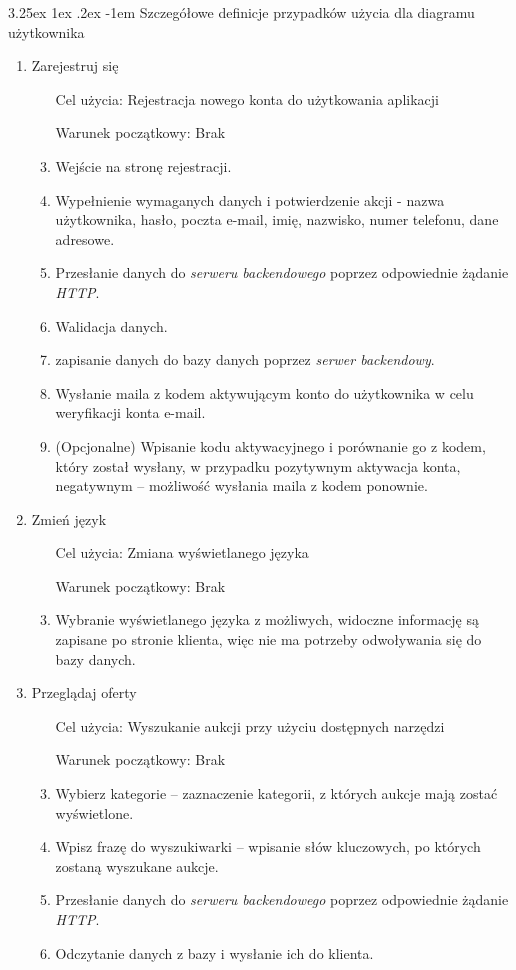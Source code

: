 \documentclass[10pt,titlepage]{article} %
\makeatletter
\renewcommand{\normalsize}{\fontsize{8pt}{10pt}\selectfont} %
\renewcommand\paragraph{\@startsection{paragraph}{5}{\z@}%
  {3.25ex \@plus1ex \@minus.2ex}%
  {-1em}%
  {\normalfont\normalsize\bfseries}}
\makeatother
\begin{document}
\paragraph{Szczegółowe definicje przypadków użycia dla diagramu użytkownika}\mbox{}\\
\begin{enumerate}[1.]
\item Zarejestruj się
\begin{enumerate}
\item[Cel użycia:] Rejestracja nowego konta do użytkowania aplikacji
\item[Warunek początkowy:] Brak
\item Wejście na stronę rejestracji.
\item Wypełnienie wymaganych danych i potwierdzenie akcji - nazwa użytkownika, hasło, poczta e-mail, imię, nazwisko, numer telefonu, dane adresowe.
\item Przesłanie danych do \textit{serweru backendowego} poprzez odpowiednie żądanie \textit{HTTP}.
\item Walidacja danych.
\item zapisanie danych do bazy danych poprzez \textit{serwer backendowy}.
\item Wysłanie maila z kodem aktywującym konto do użytkownika w celu weryfikacji konta e-mail.
\item (Opcjonalne) Wpisanie kodu aktywacyjnego i porównanie go z kodem, który został wysłany, w przypadku pozytywnym aktywacja konta, negatywnym – możliwość wysłania maila z kodem ponownie.
\end{enumerate}

\item Zmień język
\begin{enumerate}
\item[Cel użycia:] Zmiana wyświetlanego języka
\item[Warunek początkowy:] Brak
\item Wybranie wyświetlanego języka z możliwych, widoczne informację są zapisane po stronie klienta, więc nie ma potrzeby odwoływania się do bazy danych.
\end{enumerate}

\item Przeglądaj oferty
\begin{enumerate}
\item[Cel użycia:] Wyszukanie aukcji przy użyciu dostępnych narzędzi 
\item[Warunek początkowy:] Brak
\item Wybierz kategorie – zaznaczenie kategorii, z których aukcje mają zostać wyświetlone.
\item Wpisz frazę do wyszukiwarki – wpisanie słów kluczowych, po których zostaną wyszukane aukcje.
\item Przesłanie danych do \textit{serweru backendowego} poprzez odpowiednie żądanie \textit{HTTP}.
\item Odczytanie danych z bazy i wysłanie ich do klienta.
\end{enumerate}


\end{enumerate}
\end{document}
